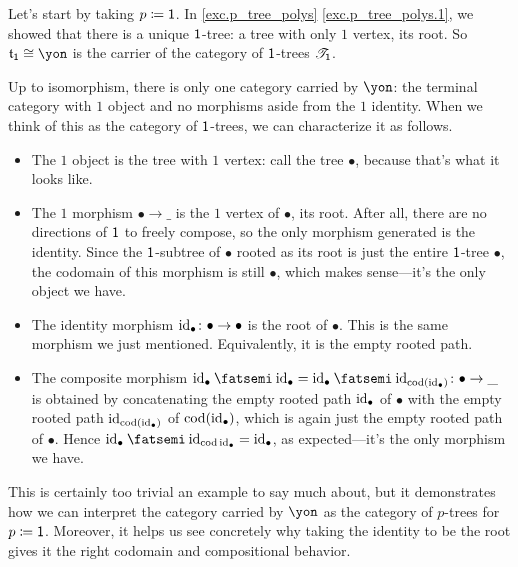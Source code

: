 \documentclass[Book-Poly]{subfiles}
\begin{document}
\begin{example}
Let's start by taking $p\coloneqq\textsf{1}$.
In \cref{exc.p_tree_polys} \cref{exc.p_tree_polys.1}, we showed that there is a unique $\textsf{1}$-tree: a tree with only $1$ vertex, its root.
So $\ema{t}_\1\iso\yon$ is the carrier of the category of $\textsf{1}$-trees $\mathscr{T}_{\textsf{1}}$.

Up to isomorphism, there is only one category carried by $\yon$: the terminal category with $1$ object and no morphisms aside from the $1$ identity.
When we think of this as the category of $\textsf{1}$-trees, we can characterize it as follows.
\begin{itemize}
    \item The $1$ object is the tree with $1$ vertex: call the tree $\bullet$, because that's what it looks like.
    \item The $1$ morphism $\bullet\to\_$ is the $1$ vertex of $\bullet$, its root.
    After all, there are no directions of $\textsf{1}$ to freely compose, so the only morphism generated is the identity.
    Since the $\textsf{1}$-subtree of $\bullet$ rooted as its root is just the entire $\textsf{1}$-tree $\bullet$, the codomain of this morphism is still $\bullet$, which makes sense---it's the only object we have.
    \item The identity morphism $\mathrm{id}_\bullet\colon\bullet\to\bullet$ is the root of $\bullet$.
    This is the same morphism we just mentioned.
    Equivalently, it is the empty rooted path.
    \item The composite morphism $\id_\bullet\then\id_\bullet=\id_\bullet\then\id_{\cod(\id_\bullet)}\colon\bullet\to\_$ is obtained by concatenating the empty rooted path $\mathrm{id}_\bullet$ of $\bullet$ with the empty rooted path $\mathrm{id}_{\operatorname{cod}(\mathrm{id}_\bullet)}$ of $\operatorname{cod}(\mathrm{id}_\bullet)$, which is again just the empty rooted path of $\bullet$.
    Hence $\id_\bullet\then\id_{\cod\id_\bullet}=\id_\bullet$, as expected---it's the only morphism we have.
\end{itemize}
This is certainly too trivial an example to say much about, but it demonstrates how we can interpret the category carried by $\yon$ as the category of $p$-trees for $p\coloneqq\textsf{1}$.
Moreover, it helps us see concretely why taking the identity to be the root gives it the right codomain and compositional behavior.

\end{example}
\end{document}
